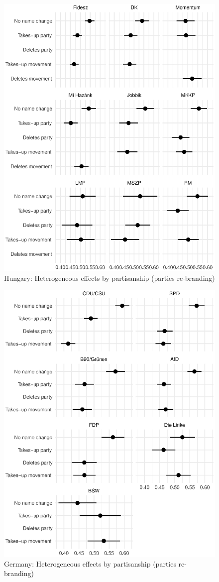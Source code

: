 \documentclass[12pt]{article}
\begin{document}
\begin{figure}[H]
\includegraphics[width=\textwidth]{./Figures/CJ2_by_party_tradeoff_Hungary.eps}
\caption{Hungary: Heterogeneous effects by partisanship (parties re-branding)}
\end{figure}

\begin{figure}[H]
\includegraphics[width=\textwidth]{./Figures/CJ2_by_party_tradeoff_Germany.eps}
\caption{Germany: Heterogeneous effects by partisanship (parties re-branding)}
\end{figure}
\end{document}

